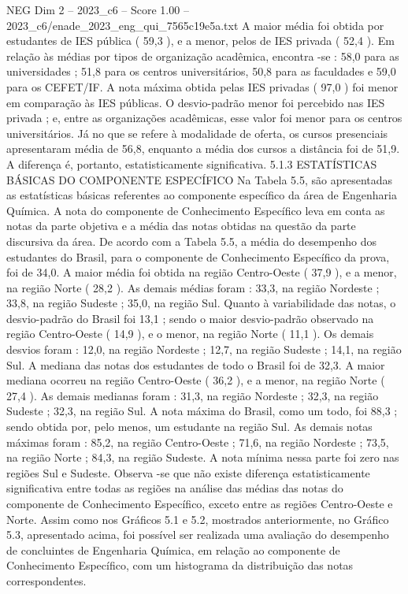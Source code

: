 \begin{textsample}{NEG Dim 2 – 2023\_c6 – Score 1.00 – 2023\_c6/enade\_2023\_eng\_qui\_7565c19e5a.txt}
A maior média foi obtida por estudantes de IES pública ( 59,3 ), e a menor, pelos de IES privada ( 52,4 ).
Em relação às médias por tipos de organização acadêmica, encontra -se : 58,0 para as universidades ; 51,8 para os centros universitários, 50,8 para as faculdades e 59,0 para os CEFET/IF.
A nota máxima obtida pelas IES privadas ( 97,0 ) foi menor em comparação às IES públicas.
O desvio-padrão menor foi percebido nas IES privada ; e, entre as organizações acadêmicas, esse valor foi menor para os centros universitários.
Já no que se refere à modalidade de oferta, os cursos presenciais apresentaram média de 56,8, enquanto a média dos cursos a distância foi de 51,9.
A diferença é, portanto, estatisticamente significativa. 5.1.3 ESTATÍSTICAS BÁSICAS DO COMPONENTE ESPECÍFICO Na Tabela 5.5, são apresentadas as estatísticas básicas referentes ao componente específico da área de Engenharia Química.
A nota do componente de Conhecimento Específico leva em conta as notas da parte objetiva e a média das notas obtidas na questão da parte discursiva da área.
De acordo com a Tabela 5.5, a média do desempenho dos estudantes do Brasil, para o componente de Conhecimento Específico da prova, foi de 34,0.
A maior média foi obtida na região Centro-Oeste ( 37,9 ), e a menor, na região Norte ( 28,2 ).
As demais médias foram : 33,3, na região Nordeste ; 33,8, na região Sudeste ; 35,0, na região Sul.
Quanto à variabilidade das notas, o desvio-padrão do Brasil foi 13,1 ; sendo o maior desvio-padrão observado na região Centro-Oeste ( 14,9 ), e o menor, na região Norte ( 11,1 ).
Os demais desvios foram : 12,0, na região Nordeste ; 12,7, na região Sudeste ; 14,1, na região Sul.
A mediana das notas dos estudantes de todo o Brasil foi de 32,3.
A maior mediana ocorreu na região Centro-Oeste ( 36,2 ), e a menor, na região Norte ( 27,4 ).
As demais medianas foram : 31,3, na região Nordeste ; 32,3, na região Sudeste ; 32,3, na região Sul.
A nota máxima do Brasil, como um todo, foi 88,3 ; sendo obtida por, pelo menos, um estudante na região Sul.
As demais notas máximas foram : 85,2, na região Centro-Oeste ; 71,6, na região Nordeste ; 73,5, na região Norte ; 84,3, na região Sudeste.
A nota mínima nessa parte foi zero nas regiões Sul e Sudeste.
Observa -se que não existe diferença estatisticamente significativa entre todas as regiões na análise das médias das notas do componente de Conhecimento Específico, exceto entre as regiões Centro-Oeste e Norte.
Assim como nos Gráficos 5.1 e 5.2, mostrados anteriormente, no Gráfico 5.3, apresentado acima, foi possível ser realizada uma avaliação do desempenho de concluintes de Engenharia Química, em relação ao componente de Conhecimento Específico, com um histograma da distribuição das notas correspondentes.

\end{textsample}
